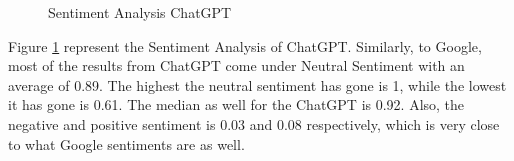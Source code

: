\documentclass[50pt]{usiinfbachelorproject}
\begin{document}
\begin{figure}[H]
  \centering
  \hfill
  \hfill
  \caption{Sentiment Analysis ChatGPT}
  \label{fig:sentiment-analysis-chatgpt}
\end{figure}

Figure \ref{fig:sentiment-analysis-chatgpt} represent the Sentiment Analysis of ChatGPT. Similarly, to Google, most of the results from ChatGPT come under Neutral Sentiment with an average of 0.89. The highest the neutral sentiment has gone is 1, while the lowest it has gone is 0.61. The median as well for the ChatGPT is 0.92. Also, the negative and positive sentiment is 0.03 and 0.08 respectively, which is very close to what Google sentiments are as well. 
\end{document}
